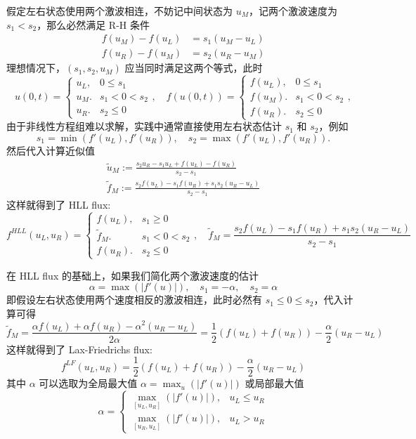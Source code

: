 假定左右状态使用两个激波相连，不妨记中间状态为 $u_M$，记两个激波速度为 $s_1 < s_2$，那么必然满足 R-H 条件
\begin{align*}
    f(u_M) - f(u_L) & = s_1(u_M - u_L) \\
    f(u_R) - f(u_M) & = s_2(u_R - u_M)
\end{align*}
理想情况下，$(s_1,s_2,u_M)$ 应当同时满足这两个等式，此时
\[
    u(0,t)  =
    \begin{cases}
        u_L, & 0 \le s_1     \\
        u_M. & s_1 < 0 < s_2 \\
        u_R. & s_2 \le 0
    \end{cases},
    \quad
    f(u(0,t))  =
    \begin{cases}
        f(u_L), & 0 \le s_1     \\
        f(u_M). & s_1 < 0 < s_2 \\
        f(u_R). & s_2 \le 0
    \end{cases},
\]
由于非线性方程组难以求解，实践中通常直接使用左右状态估计 $s_1$ 和 $s_2$，例如
\[
    s_1 = \min(f'(u_L),f'(u_R)),\quad
    s_2 = \max(f'(u_L),f'(u_R)).
\]
然后代入计算近似值
\begin{gather*}
    \tilde{u}_M := \frac{s_2 u_R - s_1 u_L + f(u_L) - f(u_R)}{s_2 - s_1}\\
    \tilde{f}_M := \frac{s_2 f(u_L) - s_1 f(u_R) + s_1 s_2(u_R - u_L)}{s_2 - s_1}
\end{gather*}
这样就得到了 HLL flux:
\[
    f^{HLL}(u_L,u_R) =
    \begin{cases}
        f(u_L),      & s_1 \ge 0     \\
        \tilde{f}_M. & s_1 < 0 < s_2 \\
        f(u_R).      & s_2 \le 0
    \end{cases},
    \quad
    \tilde{f}_M = \frac{s_2 f(u_L) - s_1 f(u_R) + s_1 s_2(u_R - u_L)}{s_2 - s_1}
\]

在 HLL flux 的基础上，如果我们简化两个激波速度的估计
\[
    \alpha = \max(|f'(u)|), \quad s_1 = -\alpha, \quad s_2 = \alpha
\]
即假设左右状态使用两个速度相反的激波相连，此时必然有 $s_1 \le 0 \le s_2$，代入计算可得
\[
    \tilde{f}_M = \frac{\alpha f(u_L) + \alpha f(u_R) - \alpha^2(u_R - u_L)}{2 \alpha} =
    \frac12(f(u_L) + f(u_R))  - \frac{\alpha}2(u_R - u_L)
\]
这样就得到了 Lax-Friedrichs flux:
\[
    f^{LF}(u_L,u_R) =\frac12(f(u_L) + f(u_R))  - \frac{\alpha}2(u_R - u_L)
\]
其中 $\alpha$ 可以选取为全局最大值 $\alpha = \max_u(|f'(u)|)$ 或局部最大值
\[
    \alpha =
    \begin{cases}
        \max_{[u_L,u_R]}(|f'(u)|), & u_L \le u_R \\
        \max_{[u_R,u_L]}(|f'(u)|), & u_L > u_R
    \end{cases}
\]
